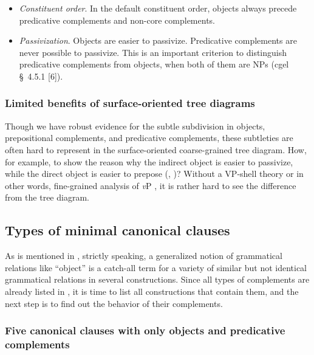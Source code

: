 \documentclass{article}
\newcommand*{\citesec}[1]{\S~{#1}}
\newcommand*{\vP}{\textit{v}P}
\begin{document}
\begin{itemize}
    \item \emph{Constituent order}. In the default constituent order,
    objects always precede predicative complements and non-core complements. %
    \item \emph{Passivization}. Objects are easier to passivize. %
    Predicative complements are never possible to passivize.
    This is an important criterion to distinguish predicative complements from objects,
    when both of them are NPs
    (\ac{cgel} \citesec{4.5.1} [6]).
\end{itemize}

\subsubsection{Limited benefits of surface-oriented tree diagrams}

Though we have robust evidence for the subtle subdivision 
in objects, prepositional complements, and predicative complements, 
these subtleties are often hard to represent in the surface-oriented coarse-grained tree diagram.
How, for example, to show the reason 
why the indirect object is easier to passivize,
while the direct object is easier to prepose 
(, )?
Without a VP-shell theory or in other words, fine-grained analysis of \vP{} \citep{harley2017syntax},
it is rather hard to see the difference from the tree diagram.

\subsection{Types of minimal canonical clauses}\label{sec:minimal-canonical-clause}

As is mentioned in ,
strictly speaking, 
a generalized notion of grammatical relations like ``object'' 
is a catch-all term for a variety of similar but not identical grammatical relations 
in several constructions.
Since all types of complements are already listed in ,
it is time to list all constructions that contain them, 
and the next step is to find out the behavior of their complements.

\subsubsection{Five canonical clauses with only objects and predicative complements}
\end{document}
